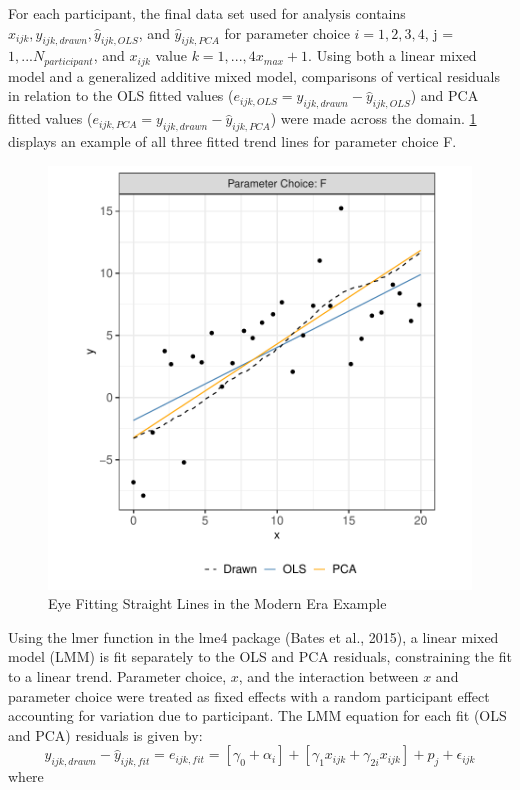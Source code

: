 \documentclass[print]{nuthesis}
\begin{document}
For each participant, the final data set used for analysis contains \(x_{ijk}, y_{ijk,drawn}, \hat y_{ijk,OLS}\), and \(\hat y_{ijk,PCA}\) for parameter choice \(i = 1,2,3,4\), j = \(1,...N_{participant}\), and \(x_{ijk}\) value \(k = 1, ...,4 x_{max} + 1\).
Using both a linear mixed model and a generalized additive mixed model, comparisons of vertical residuals in relation to the OLS fitted values (\(e_{ijk,OLS} = y_{ijk,drawn} - \hat y_{ijk,OLS}\)) and PCA fitted values (\(e_{ijk,PCA} = y_{ijk,drawn} - \hat y_{ijk,PCA}\)) were made across the domain.
\cref{fig:eyefitting-example-plot} displays an example of all three fitted trend lines for parameter choice F.

\begin{figure}[tbp]

{\centering \includegraphics[width=0.65\linewidth,]{thesis_files/figure-latex/eyefitting-example-plot-1} 

}

\caption{Eye Fitting Straight Lines in the Modern Era Example}\label{fig:eyefitting-example-plot}
\end{figure}

Using the lmer function in the lme4 package (Bates et al., 2015), a linear mixed model (LMM) is fit separately to the OLS and PCA residuals, constraining the fit to a linear trend.
Parameter choice, \(x\), and the interaction between \(x\) and parameter choice were treated as fixed effects with a random participant effect accounting for variation due to participant.
The LMM equation for each fit (OLS and PCA) residuals is given by:
\begin{equation}
y_{ijk,drawn} - \hat y_{ijk,fit} = e_{ijk,fit} = \left[\gamma_0 + \alpha_i\right] + \left[\gamma_{1} x_{ijk} + \gamma_{2i} x_{ijk}\right] + p_{j} + \epsilon_{ijk}
\end{equation}
\noindent where
\end{document}
